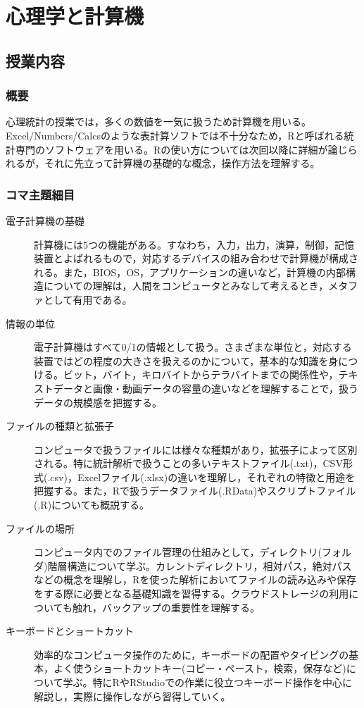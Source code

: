 \section{心理学と計算機}
\label{s01_Introduction}
\subsection{授業内容}
\subsubsection{概要}
心理統計の授業では，多くの数値を一気に扱うため計算機を用いる。Excel/Numbers/Calcsのような表計算ソフトでは不十分なため，Rと呼ばれる統計専門のソフトウェアを用いる。Rの使い方については次回以降に詳細が論じられるが，それに先立って計算機の基礎的な概念，操作方法を理解する。
\subsubsection{コマ主題細目}
\begin{description}

	\item[電子計算機の基礎] 計算機には5つの機能がある。すなわち，入力，出力，演算，制御，記憶装置とよばれるもので，対応するデバイスの組み合わせで計算機が構成される。また，BIOS，OS，アプリケーションの違いなど，計算機の内部構造についての理解は，人間をコンピュータとみなして考えるとき，メタファとして有用である。
	
	\item[情報の単位] 電子計算機はすべて0/1の情報として扱う。さまざまな単位と，対応する装置ではどの程度の大きさを扱えるのかについて，基本的な知識を身につける。ビット，バイト，キロバイトからテラバイトまでの関係性や，テキストデータと画像・動画データの容量の違いなどを理解することで，扱うデータの規模感を把握する。

	\item[ファイルの種類と拡張子] コンピュータで扱うファイルには様々な種類があり，拡張子によって区別される。特に統計解析で扱うことの多いテキストファイル(.txt)，CSV形式(.csv)，Excelファイル(.xlsx)の違いを理解し，それぞれの特徴と用途を把握する。また，Rで扱うデータファイル(.RData)やスクリプトファイル(.R)についても概説する。

	\item[ファイルの場所] コンピュータ内でのファイル管理の仕組みとして，ディレクトリ(フォルダ)階層構造について学ぶ。カレントディレクトリ，相対パス，絶対パスなどの概念を理解し，Rを使った解析においてファイルの読み込みや保存をする際に必要となる基礎知識を習得する。クラウドストレージの利用についても触れ，バックアップの重要性を理解する。

	\item[キーボードとショートカット] 効率的なコンピュータ操作のために，キーボードの配置やタイピングの基本，よく使うショートカットキー(コピー・ペースト，検索，保存など)について学ぶ。特にRやRStudioでの作業に役立つキーボード操作を中心に解説し，実際に操作しながら習得していく。


\end{description}
